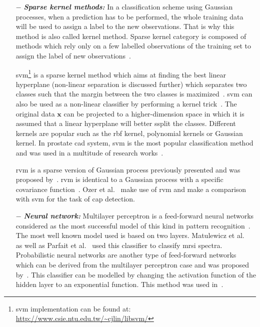 \begin{enumerate}[leftmargin=*]
\item[$-$] \textbf{\textit{Sparse kernel methods:}} In a classification scheme using Gaussian processes, when a prediction has to be performed, the whole training data will be used to assign a label to the new observations. That is why this method is also called kernel method. Sparse kernel category is composed of methods which rely only on a few labelled observations of the training set to assign the label of new observations~\cite{Bishop2006}.

  \Acf{svm}\footnote{\ac{svm} implementation can be found at: \url{http://www.csie.ntu.edu.tw/~cjlin/libsvm/}} is a sparse kernel method which aims at finding the best linear hyperplane (non-linear separation is discussed further) which separates two classes such that the margin between the two classes is maximized~\cite{Vapnik1963}. \ac{svm} can also be used as a non-linear classifier by performing a kernel trick~\cite{Boser1992}. The original data $\mathbf{x}$ can be projected to a higher-dimension space in which it is assumed that a linear hyperplane will better ssplit the classes. Different kernels are popular such as the \ac{rbf} kernel, polynomial kernels or Gaussian kernel.
In prostate \ac{cad} system, \ac{svm} is the most popular classification method and was used in a multitude of research works~\cite{Artan2009,Artan2010,Chan2003,Kelm2007,Litjens2011,Litjens2012,Liu2013,Lopes2011,Niaf2011,Niaf2012,Ozer2009,Ozer2010,Parfait2012,Peng2013,Sung2011,Tiwari2012,Vos2008,Vos2008a,Vos2010,Vos2012}.

  \Acf{rvm} is a sparse version of Gaussian process previously presented and was proposed by~\cite{Tipping2001}. \ac{rvm} is identical to a Gaussian process with a specific covariance function~\cite{Quinonero-Candela2002}. Ozer et al.~\cite{Ozer2009,Ozer2010} make use of \ac{rvm} and make a comparison with \ac{svm} for the task of \ac{cap} detection.

\item[$-$] \textbf{\textit{Neural network:}} Multilayer perceptron is a feed-forward neural networks considered as the most successful model of this kind in pattern recognition~\cite{Bishop2006}. The most well known model used is based on two layers. Matulewicz et al.~\cite{Matulewicz2013} as well as Parfait et al.~\cite{Parfait2012} used this classifier to classify \ac{mrsi} spectra.
Probabilistic neural networks are another type of feed-forward networks which can be derived from the multilayer perceptron case and was proposed by~\cite{Specht1988}. This classifier can be modelled by changing the activation function of the hidden layer to an exponential function. This method was used  in~\cite{Ampeliotis2007,Ampeliotis2008,Viswanath2011}.


\end{enumerate}
